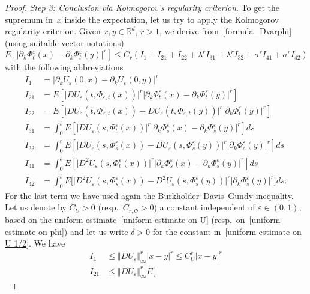 \documentclass[a4paper,10pt]{article}
\newcommand\1{\mathbbm{1}}
\newcommand{\eps}{\varepsilon}
\numberwithin{equation}{section}
\begin{document}
\begin{proof}
\emph{Step 3: Conclusion via Kolmogorov's regularity criterion}. To get the supremum in~$x$ inside the expectation, let us try to apply the Kolmogorov regularity criterion. Given $x,y\in\mathbb{R}^{d}$, $r>1$, we derive from~\eqref{formula_Dvarphi} (using suitable vector notations)
\[
E[  \vert \partial_{k}\Phi^{\eps}_{t}(x)
-\partial_{k}\Phi^{\eps}_{t}(  y)  \vert ^{r}]
\leq C_{r}(  I_{1}+I_{21}+I_{22}+\lambda^{r}I_{31}+\lambda^{r} 
I_{32}+\sigma^{r}I_{41}+\sigma^{r}I_{42})
\]
with the following abbreviations
\begin{align*}
I_{1} & =\vert \partial_{k}U_{\eps}(  0,x)  -\partial
_{k}U_{\eps}(  0,y)  \vert ^{r} \\[0.1cm]
I_{21}  & =E[  \vert DU_{\eps}(  t,\Phi_{\eps
,t}(x)  )  \vert ^{r}\vert \partial_{k} 
\Phi^{\eps}_{t}(x)  -\partial_{k}\Phi^{\eps}_{t}(
y)  \vert ^{r}]  \\[0.1cm]
I_{22}  & =E[  \vert DU_{\eps}(  t,\Phi_{\eps
,t}(x)  )  -DU_{\eps}(  t,\Phi_{\eps
,t}(  y)  )  \vert ^{r}\vert \partial_{k}
\Phi^{\eps}_{t}(  y)  \vert ^{r}] \\
I_{31}  & =\int_{0}^{t}E[  \vert DU_{\eps}(  s,\Phi
^{\eps}_{t}(x)  )  \vert ^{r}\vert
\partial_{k}\Phi^{\eps}_{s}(x)  -\partial_{k}\Phi
^{\eps}_{s}(  y)  \vert ^{r}]  ds\\
I_{32}  & =\int_{0}^{t}E[  \vert DU_{\eps}(  s,\Phi
^{\eps}_{s}(x)  )  -DU_{\eps}(  s,\Phi
^{\eps}_{s}(  y)  )  \vert ^{r}\vert
\partial_{k}\Phi^{\eps}_{s}(  y)  \vert ^{r}]  ds \\
I_{41}  & =\int_{0}^{t}E[  \vert D^{2}U_{\eps}(
s,\Phi^{\eps}_{t}(x)  )  \vert ^{r}\vert
\partial_{k}\Phi^{\eps}_{s}(x)  -\partial_{k}\Phi
^{\eps}_{s}(  y)  \vert ^{r}]  ds\\
I_{42}  & =\int_{0}^{t}E\big[  \vert D^{2}U_{\eps}(
s,\Phi^{\eps}_{s}(x)  )  -D^{2}U_{\eps}(
s,\Phi^{\eps}_{s}(  y)  )  \vert ^{r}\vert
\partial_{k}\Phi^{\eps}_{s}(  y)  \vert ^{r}\big]  ds .
\end{align*}
For the last term we have used again the Burkholder--Davis--Gundy inequality. Let us denote by $C_{U}>0$ (resp.\ $C_{r,\Phi}>0$) a constant independent of $\eps \in (0,1)$, based on the uniform estimate~\eqref{uniform estimate on U} (resp.\ on~\eqref{uniform estimate on phi}) and let us write $\delta>0$ for the constant in~\eqref{uniform estimate on U 1/2}. We have
\begin{align*}
I_{1} & \leq\Vert DU_{\varepsilon}\Vert _{\infty}^{r}\vert
x-y\vert ^{r}\leq C_{U}^{r}\vert x-y\vert ^{r} \\[0.1cm]
I_{21} & \leq\Vert DU_{\varepsilon}\Vert _{\infty}^{r}E[

\end{align*}
\end{proof}
\end{document}
